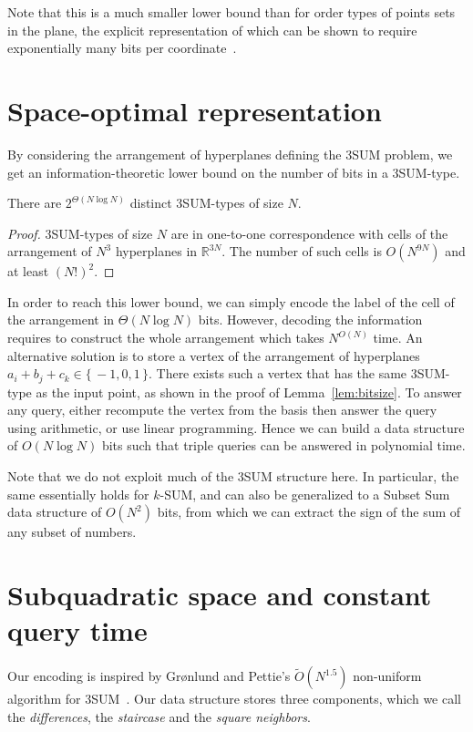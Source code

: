 Note that this is a much smaller lower bound than for order types of points sets in the plane,
the explicit representation of which can be shown to require exponentially many bits per coordinate~\cite{GPS89}.

\section{Space-optimal representation} \label{s:space}

By considering the arrangement of hyperplanes defining the 3SUM problem, we get an
information-theoretic lower bound on the number of bits in a 3SUM-type.

\begin{lemma}
  There are $2^{\Theta(N\log N)}$ distinct 3SUM-types of size $N$.
\end{lemma}
\begin{proof}
  3SUM-types of size $N$ are in one-to-one correspondence with cells of the
  arrangement of $N^3$ hyperplanes in $\mathbb{R}^{3N}$. The
  number of such cells is $O(N^{9N})$ and at least ${(N!)}^2$.
\end{proof}

In order to reach this lower bound, we can simply
encode the label of the cell of the arrangement in \(\Theta(N \log N)\) bits.
However, decoding the information
requires to construct the whole arrangement which takes \(N^{O(N)}\) time.
An alternative solution is to store a
vertex of the arrangement of hyperplanes \(a_i + b_j + c_k \in \{\,
-1, 0, 1\,\}\).
There exists such a vertex that has the same 3SUM-type as the input point, as shown in the proof of Lemma~\ref{lem:bitsize}.
To answer any query, either recompute the vertex from the basis then answer the query using arithmetic,
or use linear programming. 
Hence we can build a data structure of $O(N\log N)$ bits such that triple queries can be answered in polynomial time.

Note that we do not exploit much of the 3SUM structure here. In particular, the
same essentially holds for $k$-SUM, and can also be generalized to a {\sc
Subset Sum} data structure of $O(N^2)$ bits, from which we can extract the sign
of the sum of any subset of numbers.

\section{Subquadratic space and constant query time}\label{s:sscqt}
Our encoding is inspired by  Gr{\o}nlund and Pettie's $\tilde{O}(N^{1.5})$
non-uniform algorithm for 3SUM~\cite{GP18}.
Our data structure stores three components, which we call the
\emph{differences}, the \emph{staircase} and the \emph{square neighbors}.

